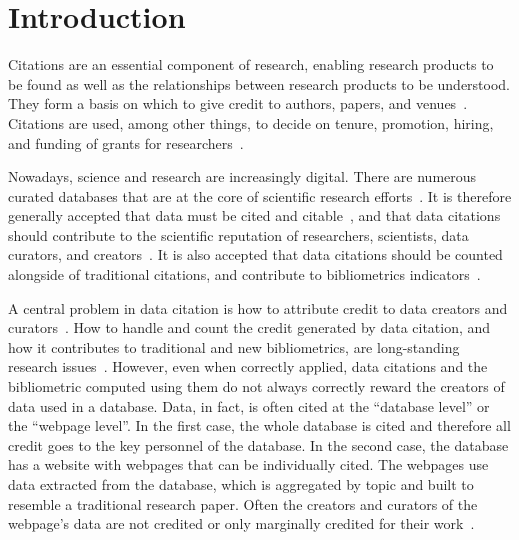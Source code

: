 \section{Introduction}

Citations are an essential component of research, enabling research products to be found as well as the relationships between research products to be understood. 
They form a basis on which to give credit to authors, papers, and venues~\citep{ZouP16, cousijn2019bringing, cronin1984}.
Citations are used, among other things, to decide on tenure, promotion, hiring, and funding of grants for researchers~\citep{meho2007impact, Cronin01, Hartley17, Kosten16}.

Nowadays, science and research are increasingly digital. There are numerous curated databases that are at the core of scientific research efforts~\citep{bunemann2016citation}.
It is therefore generally accepted that data must be cited and citable~\citep{LawrenceEtAl2011,CallaghanDPTCKABBLLMHSWW12}, and that data citations should contribute to the scientific reputation of researchers, scientists, data curators, and creators~\citep{AltmanEtAl2015,Spengler2012}.
It is also accepted that data citations should be counted alongside of traditional citations, and contribute to bibliometrics indicators~\citep{Belter2014,Peters2016}.

A central problem in data citation is how to attribute credit to data creators and curators~\citep{buneman2019summ}. 
How to handle and count the credit generated by data citation, and how it contributes to traditional and new bibliometrics, are long-standing research issues~\citep{garfield1999journal,Borgman2016}.
However, even when correctly applied, data citations and the bibliometric computed using them do not always correctly reward the creators of data used in a database.
Data, in fact, is often cited at the ``database level'' or the ``webpage level''. 
In the first case, the whole database is cited and therefore all credit goes to the key personnel of the database.
In the second case, the database has a website with webpages that can be individually cited. 
The webpages use data extracted from the database, which is aggregated by topic and built to resemble a traditional research paper.
Often the creators and curators of the webpage's data are not credited or only marginally credited for their work~\citep{AlawiniDSTW17}.

